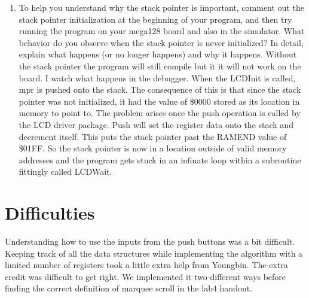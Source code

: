 \documentclass[12pt, letterpaper]{article}
\begin{document}
\begin{enumerate}

    \newpage
    \item
    To help you understand why the stack pointer is important, comment out the stack pointer initialization at the beginning of your program, and then try running the program on your mega128 board and also in the simulator. What behavior do you observe when the stack pointer is never initialized? In detail, explain what happens (or no longer happens) and why it happens.
    \newline \newline
    Without the stack pointer the program will still compile but it it will not work on the board. I watch what happens in the debugger. When the LCDInit is called, mpr is pushed onto the stack. The consequence of this is that since the stack pointer was not initialized, it had the value of \$0000 stored as its location in memory to point to. The problem arises once the push operation is called by the LCD driver package. Push will set the register data onto the stack and decrement itself. This puts the stack pointer past the RAMEND value of \$01FF. So the stack pointer is now in a location outside of valid memory addresses and the program gets stuck in an infinate loop within a subroutine fittingly called LCDWait. 



\end{enumerate}

\section{Difficulties}

Understanding how to use the inputs from the push buttons was a bit difficult. Keeping track of all the data structures while implementing the algorithm with a limited number of registers took a little extra help from Youngbin. The extra credit was difficult to get right. We implemented it two different ways before finding the correct definition of marquee scroll in the lab4 handout.
\end{document}
